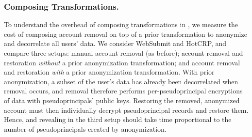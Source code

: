 %
%
%

\subsubsection{Composing \Xxing Transformations.}
\label{s:eval-composition}

%
To understand the overhead of composing transformations in \sys,
we measure the cost of composing account removal on top of
a prior \xxing transformation to anonymize and decorrelate all users' data.
%
We consider WebSubmit and HotCRP, and compare three setups: \one{} manual
account removal (as before); \two{} account removal and restoration
\emph{without} a prior anonymization \xxing transformation; and \three{} account
removal and restoration \emph{with} a prior anonymization \xxing transformation.
%
With prior anonymization, a subset of the user's data has already been decorrelated
when removal occurs, and removal therefore performs per-pseudoprincipal encryptions of
\xxed data with pseudoprincipals' public keys.
%
%
Restoring the removed, anonymized account must then individually decrypt
pseudoprincipal records and restore them.
%
Hence, \xxing and revealing in the third setup should take time proportional to
the number of pseudoprincipals created by anonymization.
%


